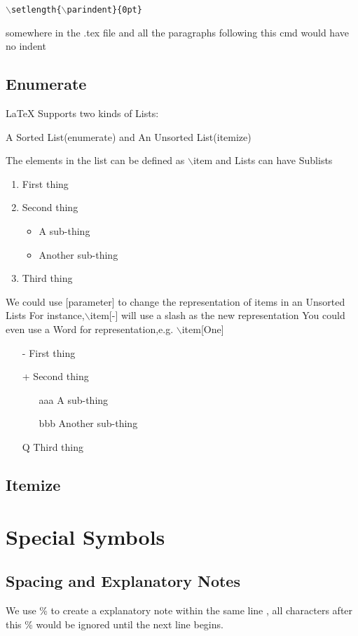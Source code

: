 \documentclass[a4paper,12pt]{article}
\begin{document}
    \texttt{$\backslash$setlength\{$\backslash$parindent\}\{0pt\}}

    somewhere in the .tex file 
    and all the paragraphs following this cmd would have no indent
    \subsection{Enumerate}
    LaTeX Supports two kinds of Lists:

    A Sorted List(enumerate) and An Unsorted List(itemize)

    The elements in the list can be defined as $\backslash$item and Lists can have Sublists 
        \begin{enumerate}
        \item First thing
        \item Second thing
        \begin{itemize}
        \item A sub-thing
        \item Another sub-thing
        \end{itemize}
        \item Third thing
        \end{enumerate}
    We could use [parameter] to change the representation
    of items in an Unsorted Lists
    For instance,$\backslash$item[-] will use a slash as the 
    new representation
    You could even use a Word for representation,e.g. $\backslash$item[One]
        \begin{itemize}
        \item[-] First thing
        \item[+] Second thing
        \begin{itemize}
        \item[aaa] A sub-thing
        \item[bbb] Another sub-thing
        \end{itemize}
        \item[Q] Third thing
        \end{itemize}


    \subsection{Itemize}
\section{Special Symbols}
\subsection{Spacing and Explanatory Notes}
We use \% to create a explanatory note within the same line
, all characters after this \% would be ignored
until the next line begins.
\end{document}
